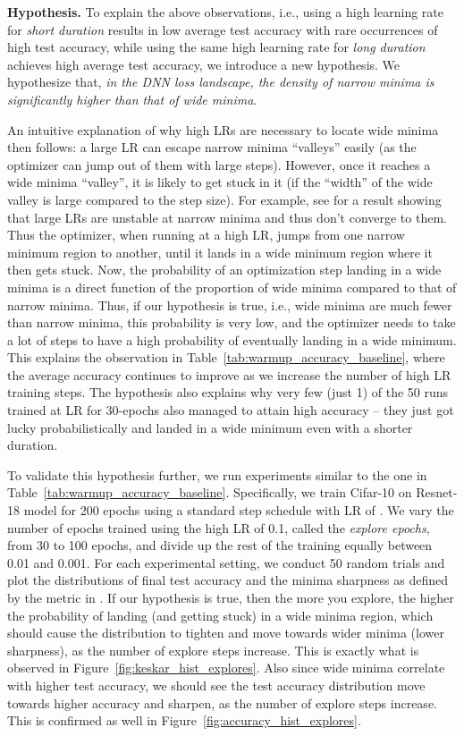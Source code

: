 \documentclass{article} \usepackage{iclr2021_conference,times}
\begin{document}
{\bf Hypothesis.}
To explain the above observations, i.e., using a high learning rate for {\it short duration} results in low average test accuracy with rare occurrences of high test accuracy, while using the same high learning rate for {\it long duration} achieves high average test accuracy, we introduce a new hypothesis. We hypothesize that, \textit{in the DNN loss landscape, the density of narrow minima is significantly  higher than that of wide minima}. 

An intuitive explanation of why high LRs are necessary to locate wide minima then follows: a large LR can escape narrow minima ``valleys'' easily (as the optimizer can jump out of them with large steps). However, once it reaches a wide minima ``valley'', it is likely to get stuck in it (if the ``width'' of the wide valley is large compared to the step size). For example, see \cite{wu2018sgd} for a result showing that large LRs are unstable at narrow minima and thus don't converge to them. Thus the optimizer, when running at a high LR, jumps from one narrow minimum region to another, until it lands in a wide minimum region where it then gets stuck. Now, the probability of an optimization step landing in a wide minima is a direct function of the proportion of wide minima compared to that of narrow minima. Thus, if our hypothesis is true, i.e., wide minima are much fewer than narrow minima, this probability is very low, and the optimizer needs to take a lot of steps to have a high probability of eventually landing in a wide minimum. This explains the observation in Table~\ref{tab:warmup_accuracy_baseline}, where the average accuracy continues to improve as we increase the number of high LR training steps. The hypothesis also explains why very few (just 1) of the 50 runs trained at  LR for 30-epochs also managed to attain high accuracy -- they just got lucky probabilistically and landed in a wide minimum even with a shorter duration.


To validate this hypothesis further, we run experiments similar to the one in Table~\ref{tab:warmup_accuracy_baseline}. Specifically, we train Cifar-10 on Resnet-18 model for 200 epochs using a standard step schedule with LR of . We vary the number of epochs trained using the high LR of 0.1, called the {\it explore epochs}, from 30 to 100 epochs, and divide up the rest of the training equally between 0.01 and 0.001. For each experimental setting, we conduct 50 random trials and plot the distributions of final test accuracy and the minima sharpness as defined by the metric in \cite{keskar2016large}. If our hypothesis is true, then the more you explore, the higher the probability of landing (and getting stuck) in a wide minima region, which should cause the distribution to tighten and move towards wider minima (lower sharpness), as the number of explore steps increase. This is exactly what is observed in Figure~\ref{fig:keskar_hist_explores}. Also since wide minima correlate with higher test accuracy, we should see the test accuracy distribution move towards higher accuracy and sharpen, as the number of explore steps increase. This is confirmed as well in Figure~\ref{fig:accuracy_hist_explores}.
\end{document}
